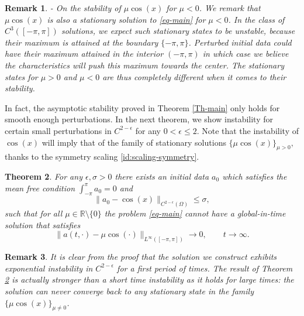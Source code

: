 \documentclass[12pt]{amsart}
\numberwithin{equation}{section}
\def\R{{\mathbb R}}
\numberwithin{equation}{section}
\newtheorem{thm}{Theorem}[section]
\newtheorem{rmk}[thm]{Remark}
\begin{document}
\begin{rmk}
\smallskip

\noindent \emph{- On the stability of $\mu \cos(x)$ for $\mu<0$.} We remark that $\mu \cos(x)$ is also a stationary solution to \eqref{eq-main} for $\mu<0$. In the class of $C^3([-\pi,\pi])$ solutions, we expect such stationary states to be unstable, because their maximum is attained at the boundary $\{-\pi,\pi\}$. Perturbed initial data could have their maximum attained in the interior $(-\pi,\pi)$ in which case we believe the characteristics will push this maximum towards the center. The stationary states for $\mu>0$ and $\mu<0$ are thus completely different when it comes to their stability.

\end{rmk}


In fact, the asymptotic stability proved in Theorem \ref{Th-main} only holds for smooth enough perturbations. In the next theorem, we show instability for certain small perturbations in $C^{2-\epsilon}$ for any $0<\epsilon\leq 2$.  Note that the instability of $\cos(x)$ will imply that  of the family of stationary solutions $\{\mu\cos(x)\}_{\mu>0},$ thanks to the symmetry scaling \eqref{id:scaling-symmetry}.
 

\begin{thm} \label{Th-main-2}
For any $\epsilon,  \sigma>0$ there exists an initial data $a_0$ which satisfies the mean free condition $\int_{-\pi}^\pi a_0=0$ and
\begin{equation}\label{Th-ic}
\|a_0 -\cos ( x)\|_{C^{2-\epsilon}(\Omega)}\leq \sigma,
\end{equation}
such that for all $\mu\in\R\setminus\{0\}$ the problem  \eqref{eq-main} cannot have a global-in-time solution that satisfies
\begin{equation}\label{TH2-behavior}
\|a(t, \cdot)-\mu \cos(\cdot)\|_{L^\infty([-\pi,\pi])}\to 0,\qquad t\to\infty.
\end{equation}
\end{thm}


\begin{rmk}

It is clear from the proof that the solution we construct exhibits exponential instability in $C^{2-\epsilon}$ for a first period of times. The result of Theorem \ref{Th-main-2} is actually stronger than a short time instability  as it holds for large times: the solution can never converge back to any stationary state in the family $\{\mu \cos(x)\}_{\mu\neq 0}$.

\end{rmk}
\end{document}
